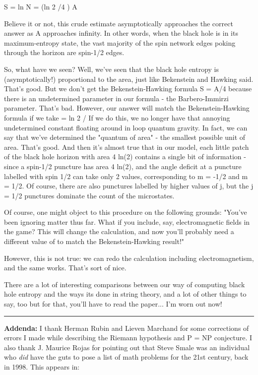                S = ln N = (ln 2 /4 \pi  \gamma  {}) A


Believe it or not, this crude estimate asymptotically approaches the
correct answer as A approaches infinity.  In other words, when the
black hole is in its maximum-entropy state, the vast majority of the spin
network edges poking through the horizon are spin-1/2 edges.
            
So, what have we seen?  Well, we've seen that the black hole entropy
is (asymptotically!) proportional to the area, just like Bekenstein
and Hawking said.  That's good.  But we don't get the Bekenstein-Hawking
formula
                         S = A/4
because there is an undetermined parameter in our formula - the
Barbero-Immirzi parameter.  That's bad.  However, our answer will match
the Bekenstein-Hawking formula if we take
                   \gamma  = ln 2 / \pi  {}
If we do this, we no longer have that annoying undetermined constant
floating around in loop quantum gravity.  In fact, we can say that we've
determined the "quantum of area" - the smallest possible unit
of area.  That's good.  And then it's almost true that in our model,
each little patch of the black hole horizon with area 4 ln(2) contains a
single bit of information - since a spin-1/2 puncture has area 4 ln(2),
and the angle deficit at a puncture labelled with spin 1/2 can take only
2 values, corresponding to m = -1/2 and m = 1/2.  Of course, there are also  
punctures labelled by higher values of j, but the j = 1/2 punctures 
dominate the count of the microstates.

Of course, one might object to this procedure on the following grounds:
"You've been ignoring matter thus far.  What if you include, say, 
electromagnetic fields in the game?  This will change the calculation,
and now you'll probably need a different value of \gamma  to match the
Bekenstein-Hawking result!"  

However, this is not true: we can redo the calculation including 
electromagnetism, and the same \gamma  works.  That's sort of nice.

There are a lot of interesting comparisons between our way of computing
black hole entropy and the ways its done in string theory, and a lot
of other things to say, too but for that, you'll have to read the paper... 
I'm worn out now!

\par\noindent\rule{\textwidth}{0.4pt}
\textbf{Addenda:}
I thank Herman Rubin and Lieven Marchand for some corrections of 
errors I made while describing the Riemann hypothesis and P = NP
conjecture.    I also thank J. Maurice Rojas for pointing out that
Steve Smale was an individual who \emph{did} have the guts to pose a list 
of math problems for the 21st century, back in 1998.  This appears in:

